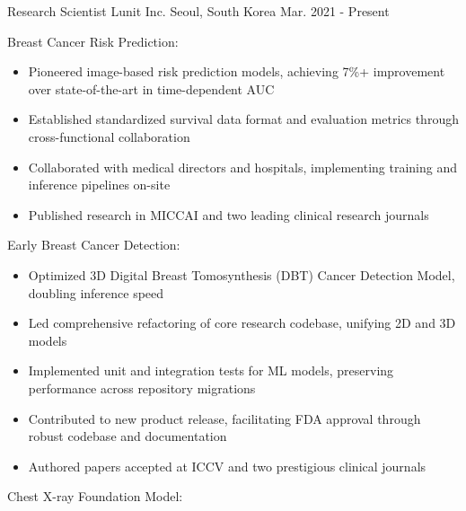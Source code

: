 
\begin{cventries}

  \cventry
  {Research Scientist} %
  {Lunit Inc.} %
  {Seoul, South Korea} %
  {Mar. 2021 - Present} %
  {
    \begin{cvitems} %
      \item {Breast Cancer Risk Prediction:}
      \begin{itemize}
        \item Pioneered image-based risk prediction models, achieving 7\%+ improvement over state-of-the-art in time-dependent AUC
        \item Established standardized survival data format and evaluation metrics through cross-functional collaboration
        \item Collaborated with medical directors and hospitals, implementing training and inference pipelines on-site
        \item Published research in MICCAI and two leading clinical research journals
      \end{itemize}
      \item {Early Breast Cancer Detection:}
      \begin{itemize}
        \item Optimized 3D Digital Breast Tomosynthesis (DBT) Cancer Detection Model, doubling inference speed
        \item Led comprehensive refactoring of core research codebase, unifying 2D and 3D models
        \item Implemented unit and integration tests for ML models, preserving performance across repository migrations
        \item Contributed to new product release, facilitating FDA approval through robust codebase and documentation
        \item Authored papers accepted at ICCV and two prestigious clinical journals
      \end{itemize}
      \item {Chest X-ray Foundation Model:}

\end{cvitems}}
\end{cventries}
